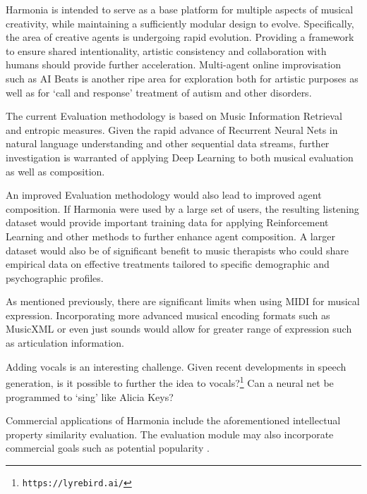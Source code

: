 \documentclass[final,authoryear,5p,times,twocolumn]{elsarticle}
\begin{document}
Harmonia is intended to serve as a base platform for multiple aspects of musical creativity, while maintaining a sufficiently modular design to evolve. Specifically, the area of creative agents is undergoing rapid evolution. Providing a framework to ensure shared intentionality, artistic consistency and collaboration with humans should provide further acceleration. Multi-agent online improvisation such as AI Beats is another ripe area for exploration both for artistic purposes as well as for `call and response' treatment of autism and other disorders. 

The current Evaluation methodology is based on Music Information Retrieval and entropic measures. Given the rapid advance of Recurrent Neural Nets in natural language understanding and other sequential data streams, further investigation is warranted of applying Deep Learning to both musical evaluation as well as composition.

An improved Evaluation methodology would also lead to improved agent composition. If Harmonia were used by a large set of users, the resulting listening dataset would provide important training data for applying Reinforcement Learning and other methods to further enhance agent composition. A larger dataset would also be of significant benefit to music therapists who could share empirical data on effective treatments tailored to specific demographic and psychographic profiles.

As mentioned previously, there are significant limits when using MIDI for musical expression. Incorporating more advanced musical encoding formats such as MusicXML or even just sounds would allow for greater range of expression such as articulation information.

Adding vocals is an interesting challenge. Given recent developments in speech generation, is it possible to further the idea to vocals?\footnote{\texttt{https://lyrebird.ai/}} Can a neural net be programmed to `sing' like Alicia Keys? 

Commercial applications of Harmonia include the aforementioned intellectual property similarity evaluation. The evaluation module may also incorporate commercial goals such as potential popularity \citep{phampredicting}.



\end{document}
